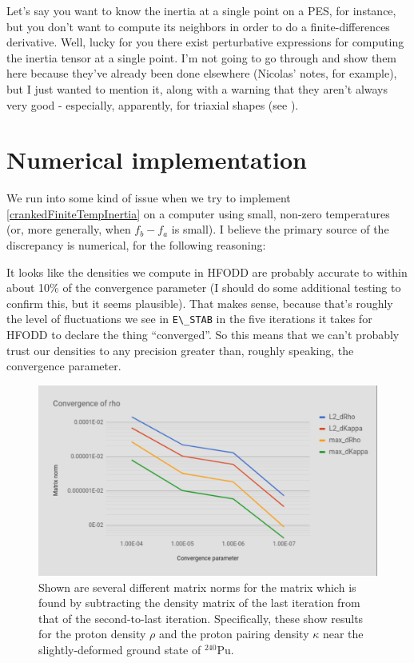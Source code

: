 Let's say you want to know the inertia at a single point on a PES, for instance, but you don't want to compute its neighbors in order to do a finite-differences derivative. Well, lucky for you there exist perturbative expressions for computing the inertia tensor at a single point. I'm not going to go through and show them here because they've already been done elsewhere (Nicolas' notes, for example), but I just wanted to mention it, along with a warning that they aren't always very good - especially, apparently, for triaxial shapes (see \cite{Sadhukhan2013}).

\section{Numerical implementation}

We run into some kind of issue when we try to implement \ref{crankedFiniteTempInertia} on a computer using small, non-zero temperatures (or, more generally, when $f_b-f_a$ is small). I believe the primary source of the discrepancy is numerical, for the following reasoning:

It looks like the densities we compute in HFODD are probably accurate to within about 10\% of the convergence parameter (I should do some additional testing to confirm this, but it seems plausible). That makes sense, because that's roughly the level of fluctuations we see in \verb|E\_STAB| in the five iterations it takes for HFODD to declare the thing ``converged''. So this means that we can't probably trust our densities to any precision greater than, roughly speaking, the convergence parameter.

\begin{figure}
\centering
\includegraphics[width=0.7\linewidth]{TeX_files/rho_conv}
\caption{Shown are several different matrix norms for the matrix which is found by subtracting the density matrix of the last iteration from that of the second-to-last iteration. Specifically, these show results for the proton density $\rho$ and the proton pairing density $\kappa$ near the slightly-deformed ground state of $^{240}$Pu.}
\label{fig:rho_conv}
\end{figure}


